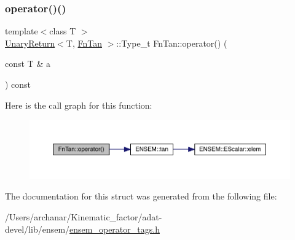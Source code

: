 \subsubsection{\texorpdfstring{operator()()}{operator()()}\hspace{0.1cm}{\footnotesize\ttfamily [3/3]}}
{\footnotesize\ttfamily template$<$class T $>$ \\
\mbox{\hyperlink{structUnaryReturn}{Unary\+Return}}$<$T, \mbox{\hyperlink{structFnTan}{Fn\+Tan}} $>$\+::Type\+\_\+t Fn\+Tan\+::operator() (\begin{DoxyParamCaption}\item[{const T \&}]{a }\end{DoxyParamCaption}) const\hspace{0.3cm}{\ttfamily [inline]}}

Here is the call graph for this function\+:
\nopagebreak
\begin{figure}[H]
\begin{center}
\leavevmode
\includegraphics[width=350pt]{d8/dce/structFnTan_a067d849927778152282097f8efe5cdf1_cgraph}
\end{center}
\end{figure}


The documentation for this struct was generated from the following file\+:\begin{DoxyCompactItemize}
\item 
/\+Users/archanar/\+Kinematic\+\_\+factor/adat-\/devel/lib/ensem/\mbox{\hyperlink{adat-devel_2lib_2ensem_2ensem__operator__tags_8h}{ensem\+\_\+operator\+\_\+tags.\+h}}\end{DoxyCompactItemize}
